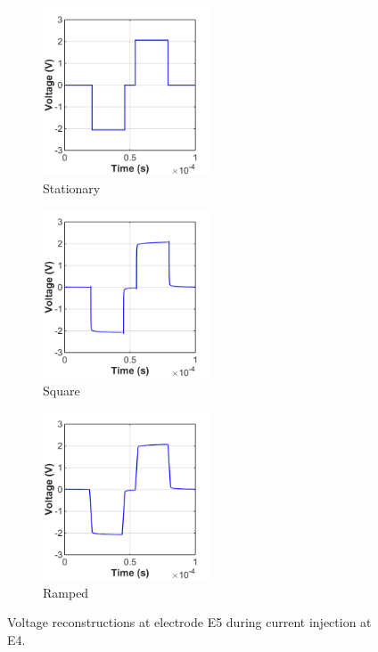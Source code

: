 \begin{figure}[p]
    \centering
    \begin{subfigure}[t]{0.33\textwidth}
        \centering
        \includegraphics[width=5cm]{Simulations/TimeDep/Vt-term4-hemi_gnd-stat}
        \caption{Stationary}
        \label{fig:e5_volt_stat}
    \end{subfigure}%
	\hfill%
	\begin{subfigure}[t]{0.33\textwidth}
        \centering
        \includegraphics[width=5cm]{Simulations/TimeDep/Vt-term4-hemi_gnd-S5000_E5}
        \caption{Square}
        \label{fig:e5_volt_S5000}
    \end{subfigure}%
    \hfill%
    \begin{subfigure}[t]{0.33\textwidth}
        \centering
        \includegraphics[width=5cm]{Simulations/TimeDep/Vt-term4-hemi_gnd-R300_E5}
        \caption{Ramped}
        \label{fig:e5_volt_R300}
    \end{subfigure}%
    
	\caption[Voltage reconstructions at electrode E5]{Voltage reconstructions at
	electrode E5 during current injection at E4.}
	\label{fig:voltage_comparison_td}
\end{figure}

